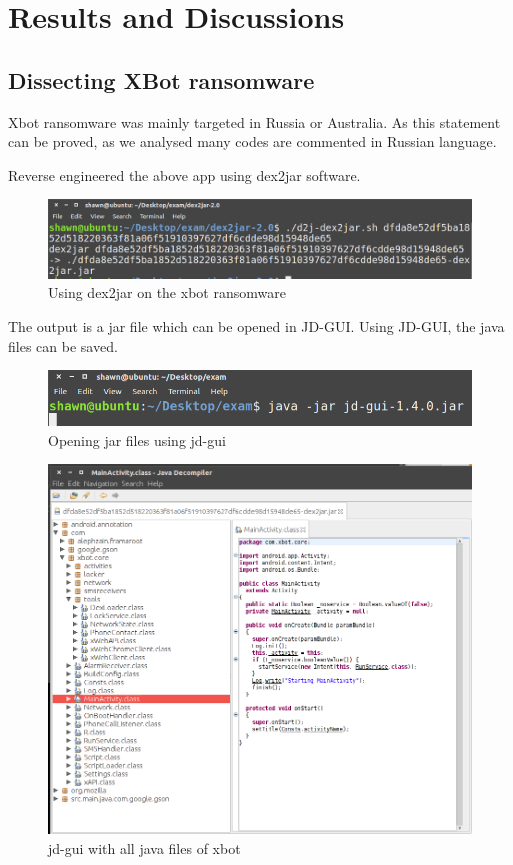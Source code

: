 \chapter{Results and Discussions}

\section{Dissecting XBot ransomware}

Xbot ransomware \cite{xbot} was mainly targeted in Russia or Australia.
As this statement can be proved, as we analysed many codes are commented in Russian language.

Reverse engineered the above app using dex2jar software.

\begin{figure}[H]
\centering
\includegraphics[scale=0.3]{dex2jar}
\caption{Using dex2jar on the xbot ransomware}
\label{fig:ra}
\end{figure}

The output is a jar file which can be opened in JD-GUI.
Using JD-GUI, the java files can be saved.

\begin{figure}[H]
\centering
\includegraphics[scale=0.5]{jd-gui1}
\caption{Opening jar files using jd-gui}
\label{fig:ra}
\end{figure}

\begin{figure}[H]
\centering
\includegraphics[scale=0.3]{jd-gui2}
\caption{jd-gui with all java files of xbot}
\label{fig:ra}
\end{figure}


